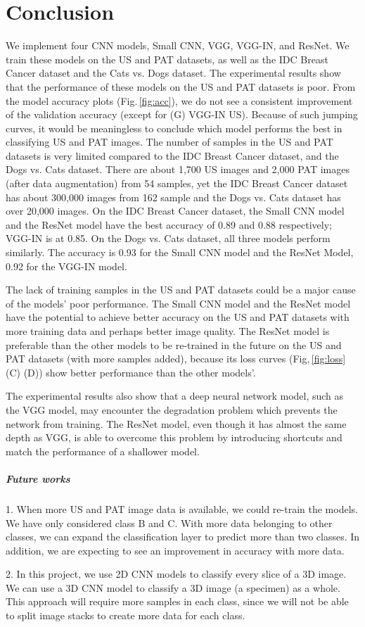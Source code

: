 \chapter{Conclusion} 
\label{conclusion}

We implement four CNN models, Small CNN, VGG, VGG-IN, and ResNet. We train these models on the US and PAT datasets, as well as the IDC Breast Cancer dataset and the Cats vs. Dogs dataset. The experimental results show that the performance of these models on the US and PAT datasets is poor. From the model accuracy plots (Fig.\,\ref{fig:acc}), we do not see a consistent improvement of the validation accuracy (except for (G) VGG-IN US). Because of such jumping curves, it would be meaningless to conclude which model performs the best in classifying US and PAT images. The number of samples in the US and PAT datasets is very limited compared to the IDC Breast Cancer dataset, and the Dogs vs. Cats dataset. There are about 1,700 US images and 2,000 PAT images (after data augmentation) from 54 samples, yet the IDC Breast Cancer dataset has about 300,000 images from 162 sample and the Dogs vs. Cats dataset has over 20,000 images. On the IDC Breast Cancer dataset, the Small CNN model and the ResNet model have the best accuracy of 0.89 and 0.88 respectively; VGG-IN is at 0.85. On the Dogs vs. Cats dataset, all three models perform similarly. The accuracy is 0.93 for the Small CNN model and the ResNet Model, 0.92 for the VGG-IN model.

The lack of training samples in the US and PAT datasets could be a major cause of the models' poor performance. The Small CNN model and the ResNet model have the potential to achieve better accuracy on the US and PAT datasets with more training data and perhaps better image quality. The ResNet model is preferable than the other models to be re-trained in the future on the US and PAT datasets (with more samples added), because its loss curves (Fig,\,\ref{fig:loss} (C) (D)) show better performance than the other models'.

The experimental results also show that a deep neural network model, such as the VGG model, may encounter the degradation problem which prevents the network from training. The ResNet model, even though it has almost the same depth as VGG, is able to overcome this problem by introducing shortcuts and match the performance of a shallower model.

\paragraph{Future works}

1. When more US and PAT image data is available, we could re-train the models. We have only considered class B and C. With more data belonging to other classes, we can expand the classification layer to predict more than two classes. In addition, we are expecting to see an improvement in accuracy with more data.

2. In this project, we use 2D CNN models to classify every slice of a 3D image. We can use a 3D CNN model \citep{tran2015learning} to classify a 3D image (a specimen) as a whole. This approach will require more samples in each class, since we will not be able to split image stacks to create more data for each class.